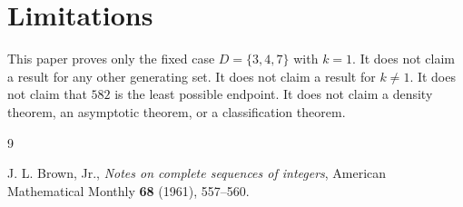 \documentclass[11pt]{article}
\begin{document}
\section{Limitations}

This paper proves only the fixed case \(D=\{3,4,7\}\) with \(k=1\). It does not
claim a result for any other generating set. It does not claim a result for
\(k\ne1\). It does not claim that \(582\) is the least possible endpoint. It does
not claim a density theorem, an asymptotic theorem, or a classification theorem.


\begin{thebibliography}{9}

J. L. Brown, Jr.,
\emph{Notes on complete sequences of integers},
American Mathematical Monthly \textbf{68} (1961), 557--560.

\end{thebibliography}
\end{document}
